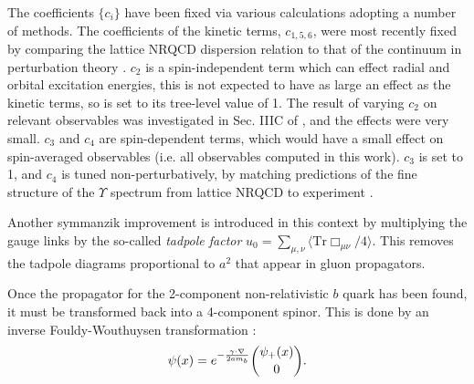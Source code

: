     The coefficients $\{c_i\}$ have been fixed via various calculations adopting a number of methods. The coefficients of the kinetic terms, $c_{1,5,6}$, were most recently fixed by comparing the lattice NRQCD dispersion relation to that of the continuum in perturbation theory \cite{Davies:2018fwg}. $c_2$ is a spin-independent term which can effect radial and orbital excitation energies, this is not expected to have as large an effect as the kinetic terms, so is set to its tree-level value of 1. The result of varying $c_2$ on relevant observables was investigated in Sec. IIIC of \cite{Dowdall:2011wh}, and the effects were very small. $c_3$ and $c_4$ are spin-dependent terms, which would have a small effect on spin-averaged observables (i.e. all observables computed in this work). $c_3$ is set to 1, and $c_4$ is tuned non-perturbatively, by matching predictions of the fine structure of the $\Upsilon$ spectrum from lattice NRQCD to experiment \cite{Dowdall:2011wh}.

Another symmanzik improvement is introduced in this context by multiplying the gauge links by the so-called {\textit{tadpole factor}} $u_0 = \sum_{\mu,\nu}\langle \text{Tr}\Box_{\mu\nu} /4\rangle$. This removes the tadpole diagrams proportional to $a^2$ that appear in gluon propagators.
    
    Once the propagator for the 2-component non-relativistic $b$ quark has been found, it must be transformed back into a 4-component spinor. This is done by an inverse Fouldy-Wouthuysen transformation \cite{PhysRev.78.29}:
    \begin{align}
      \psi(x) = e^{-{{\bf{\gamma}}\cdot{\bf{\nabla}}\over 2am_b}}\binom{\psi_+(x)}{0}.
      \label{eq:FoldyWoldy}
      \end{align}
